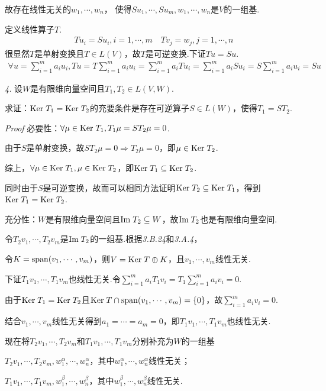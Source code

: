 故存在线性无关的\(w_1,\cdots,w_n\)， 使得\(Su_1,\cdots,Su_m,w_1,\cdots,w_n\)是\(V\)的一组基.

定义线性算子\(T\).
    \begin{align*}
        Tu_i=Su_i,i=1,\cdots,m \quad Tv_j=w_j,j=1,\cdots,n
    \end{align*}
很显然\(T\)是单射变换且\(T \in L(V)\)，故\(T\)是可逆变换.下证\(Tu=Su\).
    \begin{align*}
        \forall u=\sum_{i=1}^m a_iu_i,Tu=T\sum_{i=1}^m a_iu_i
        =\sum_{i=1}^m a_iTu_i=\sum_{i=1}^m a_iSu_i=S\sum_{i=1}^m a_iu_i=Su
    \end{align*}

\newpage

\textit{4.}
设\(W\)是有限维向量空间且\(T_1,T_2 \in L(V,W)\).

求证：\(\mathrm{Ker \;} T_1=\mathrm{Ker \;} T_2\)的充要条件是存在可逆算子\(S \in L(W)\)，使得\(T_1=ST_2\).

\textit{Proof}
必要性：\(\forall \mu \in \mathrm{Ker \;} T_1,T_1 \mu=ST_2 \mu =0\).

由于\(S\)是单射变换，故\(ST_2 \mu =0 \Rightarrow T_2 \mu =0\)，即\(\mu \in \mathrm{Ker \;} T_2\).

综上，\(\forall \mu \in \mathrm{Ker \;} T_1, \mu \in \mathrm{Ker \;} T_2\)，即\(\mathrm{Ker \;} T_1 \subseteq \mathrm{Ker \;} T_2\).

同时由于\(S\)是可逆变换，故而可以相同方法证明\(\mathrm{Ker \;} T_2 \subseteq \mathrm{Ker \;} T_1\)，得到\(\mathrm{Ker \;} T_1=\mathrm{Ker \;} T_2\).

充分性：\(W\)是有限维向量空间且\(\mathrm{Im \;} T_2 \subseteq W\)，故\(\mathrm{Im \;} T_2\)也是有限维向量空间.

令\(T_2v_1,\cdots,T_2v_m\)是\(\mathrm{Im \;} T_2\)的一组基.根据\textit{3.B.24}和\textit{3.A.4}，

令\(K=\mathrm{span} (v_1,\cdots,v_m)\)，则\(V=\mathrm{Ker \;} T \oplus K\)，且\(v_1,\cdots,v_m\)线性无关.

下证\(T_1v_1,\cdots,T_1v_m\)也线性无关.令\(\sum_{i=1}^m a_iT_1v_i=T_1\sum_{i=1}^m a_iv_i=0\).

由于\(\mathrm{Ker \;} T_1=\mathrm{Ker \;} T_2\)且\(\mathrm{Ker \;} T \cap \mathrm{span} (v_1,\cdots,v_m)=\{0\}\)，故\(\sum_{i=1}^m a_iv_i=0\).

结合\(v_1,\cdots,v_m\)线性无关得到\(a_1=\cdots=a_m=0\)，即\(T_1v_1,\cdots,T_1v_m\)也线性无关.

现在将\(T_2v_1,\cdots,T_2v_m\)和\(T_1v_1,\cdots,T_1v_m\)分别补充为\(W\)的一组基

\(T_2v_1,\cdots,T_2v_m,w_1^\alpha,\cdots,w_n^\alpha\)，其中\(w_1^\alpha,\cdots,w_n^\alpha\)线性无关；

\(T_1v_1,\cdots,T_1v_m,w_1^\beta,\cdots,w_n^\beta\)，其中\(w_1^\beta,\cdots,w_n^\beta\)线性无关.

